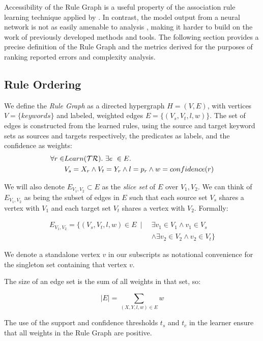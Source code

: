 Accessibility of the Rule Graph is a useful property of the association 
rule learning technique applied by \app.
In contrast, the model output from a neural network is not as easily 
amenable to analysis \cite{nnAnalysis1, nnAnalysis2}, making it harder
to build on the work of previously developed methods and tools.
The following section provides a precise definition of the Rule Graph
and the metrics derived for the purposes of ranking reported errors
and complexity analysis.

\subsection{Rule Ordering}
\label{sec:ruleorder}

We define the \textit{Rule Graph} as a directed hypergraph $H = (V,E)$,
   with vertices $V = \{ keywords \}$ and labeled, weighted edges $E = \{ (V_s, V_t, l, w) \}$.
The set of edges is constructed from the learned rules, using the source and target keyword sets as sources and targets respectively, the predicates as labels, and the confidence as weights:
%
\begin{align*}
\forall r \in & Learn(\mathcal{TR}).\ \exists e\ \in E.\\
              & V_s = X_r \land V_t=Y_r \land l=p_r \land w = confidence(r)
\end{align*}

We will also denote $E_{V_1, V_2} \subset E$ as the \textit{slice set} 
of $E$ over $V_1, V_2$.
We can think of $E_{V_1, V_2}$ as being the subset of edges in $E$ 
such that each source set $V_s$ shares a vertex with $V_1$
and each target set $V_t$ shares a vertex with $V_2$.
Formally: 

\begin{align*}
    E_{V_1, V_2} = \{ \left( V_s, V_t, l, w \right) \in E \ \mid \ & \exists v_1 \in V_1 \land v_1 \in V_s \\
    & \land \exists v_2 \in V_2 \land v_2 \in V_t \}
\end{align*}


We denote a standalone vertex $v$ in our subscripts as notational 
convenience for the singleton set containing that vertex $v$.

The size of an edge set is the sum of all weights in that set, so:

    $$|E| = \sum_{(X, Y, l, w) \in E} w$$

The use of the support and confidence thresholds $t_s$ and $t_c$ in the learner ensure 
that all weights in the Rule Graph are positive.

